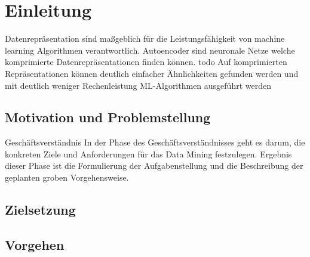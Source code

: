 \listoftodos


 
\chapter{Einleitung}
\label{chap:Einleitung}
	Datenrepräsentation sind maßgeblich für die Leistungsfähigkeit von machine learning Algorithmen verantwortlich. Autoencoder sind neuronale Netze welche komprimierte Datenrepräsentationen finden können. todo Auf komprimierten Repräsentationen können deutlich einfacher Ähnlichkeiten gefunden werden  und mit deutlich weniger Rechenleistung ML-Algorithmen ausgeführt werden
  

	\section{Motivation und Problemstellung}
	\label{sec:MotivationUndProblemstellung}

	Geschäftsverständnis
	In der Phase des Geschäftsverständnisses geht es darum, die konkreten Ziele und Anforderungen für das Data Mining festzulegen. Ergebnis dieser Phase ist die Formulierung der Aufgabenstellung und die Beschreibung der geplanten groben Vorgehensweise.
	

	\section{Zielsetzung}
	\label{sec:Zielsetzung}

	\section{Vorgehen}
	\label{sec:Vorgehen}



